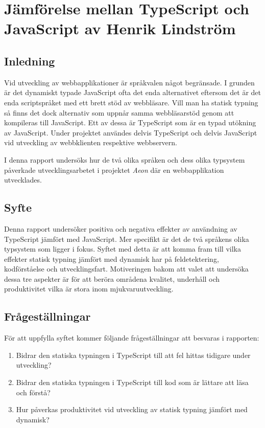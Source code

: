 \chapter{Jämförelse mellan TypeScript och JavaScript av Henrik Lindström}

\section{Inledning}
Vid utveckling av webbapplikationer är språkvalen något begränsade. I grunden är det dynamiskt typade JavaScript ofta det enda alternativet eftersom det är det enda scriptspråket med ett brett stöd av webbläsare. Vill man ha statisk typning så finns det dock alternativ som uppnår samma webbläsarstöd genom att kompileras till JavaScript. Ett av dessa är TypeScript som är en typad utökning av JavaScript. Under projektet användes delvis TypeScript och delvis JavaScript vid utveckling av webbklienten respektive webbservern.

I denna rapport undersöks hur de två olika språken och dess olika typsystem påverkade utvecklingsarbetet i projektet \textit{Aeon} där en webbapplikation utvecklades.
\section{Syfte}
Denna rapport undersöker positiva och negativa effekter av användning av TypeScript jämfört med JavaScript. Mer specifikt är det de två språkens olika typsystem som ligger i fokus. Syftet med detta är att komma fram till vilka effekter statisk typning jämfört med dynamisk har på feldetektering, kodförståelse och utvecklingsfart. Motiveringen bakom att valet att undersöka dessa tre aspekter är för att beröra områdena kvalitet, underhåll och produktivitet vilka är stora inom mjukvaruutveckling.

\section{Frågeställningar}
För att uppfylla syftet kommer följande frågeställningar att besvaras i rapporten:
\begin{enumerate}
\item Bidrar den statiska typningen i TypeScript till att fel hittas tidigare under utveckling?
\item Bidrar den statiska typningen i TypeScript till kod som är lättare att läsa och förstå?
\item Hur påverkas produktivitet vid utveckling av statisk typning jämfört med dynamisk?
\end{enumerate}
